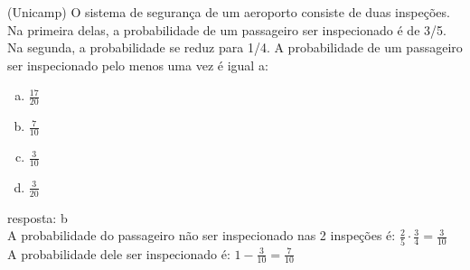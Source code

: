\begin{ex}
 (Unicamp) O sistema de segurança de um aeroporto consiste de duas inspeções. Na primeira delas, a probabilidade de um passageiro ser inspecionado é de 3/5. Na segunda, a probabilidade se reduz para 1/4. A probabilidade de um passageiro ser inspecionado pelo menos uma vez é igual a:
   \begin{enumerate} [(a)]
       \item $\frac{17}{20}$
       \item $\frac{7}{10}$
       \item $\frac{3}{10}$
       \item $\frac{3}{20}$
   \end{enumerate}
     \begin{sol}
     resposta: b \\
     A probabilidade do passageiro não ser inspecionado nas 2 inspeções é: $\frac{2}{5}\cdot\frac{3}{4}=\frac{3}{10}$ \\
     A probabilidade dele ser inspecionado é: $1-\frac{3}{10}=\frac{7}{10}$
     \end{sol}
 \end{ex}